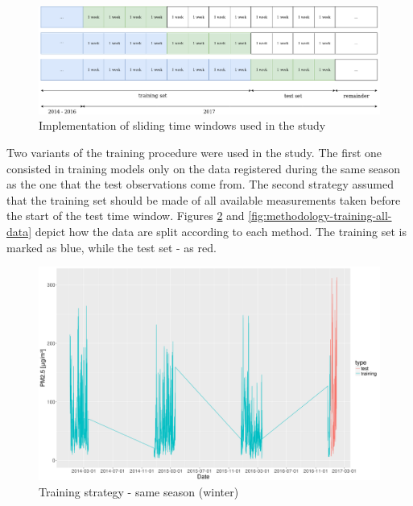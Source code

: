 \begin{figure}[H]
\centering
      \includegraphics[width=\textwidth]{figures/methodology/time_windows.png}
      \caption{Implementation of sliding time windows used in the study}
      \label{fig:methodology-time-windows}
\end{figure}
\noindent Two variants of the training procedure were used in the study. The first one consisted in training models only on the data registered during the same season as the one that the test observations come from. The second strategy assumed that the training set should be made of all available measurements taken before the start of the test time window. Figures \ref{fig:methodology-training-same-season}  and \ref{fig:methodology-training-all-data} depict how the data are split according to each method. The training set is marked as blue, while the test set - as red.
\begin{figure}[H]
\centering
  \centering
  \includegraphics[width=0.95\linewidth]{figures/methodology/split/same_season_split_1.png}
  \caption{Training strategy - same season (winter)}
  \label{fig:methodology-training-same-season}
\end{figure}
